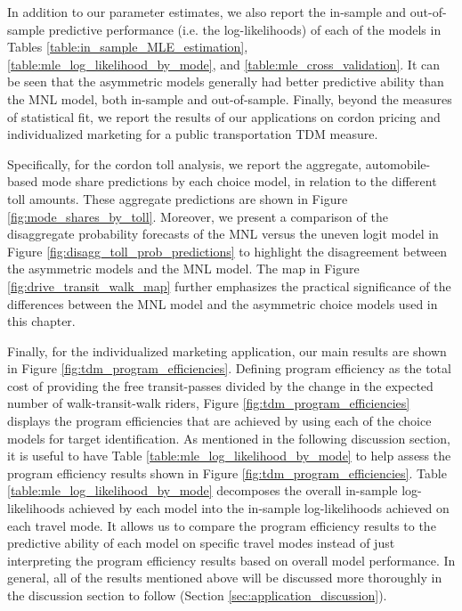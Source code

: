In addition to our parameter estimates, we also report the in-sample and out-of-sample predictive performance (i.e. the log-likelihoods) of each of the models in Tables \ref{table:in_sample_MLE_estimation}, \ref{table:mle_log_likelihood_by_mode}, and \ref{table:mle_cross_validation}. It can be seen that the asymmetric models generally had better predictive ability than the MNL model, both in-sample and out-of-sample. Finally, beyond the measures of statistical fit, we report the results of our applications on cordon pricing and individualized marketing for a public transportation TDM measure.

Specifically, for the cordon toll analysis, we report the aggregate, automobile-based mode share predictions by each choice model, in relation to the different toll amounts. These aggregate predictions are shown in Figure \ref{fig:mode_shares_by_toll}. Moreover, we present a comparison of the disaggregate probability forecasts of the MNL versus the uneven logit model in Figure \ref{fig:disagg_toll_prob_predictions} to highlight the disagreement between the asymmetric models and the MNL model. The map in Figure \ref{fig:drive_transit_walk_map} further emphasizes the practical significance of the differences between the MNL model and the asymmetric choice models used in this chapter. 

Finally, for the individualized marketing application, our main results are shown in Figure \ref{fig:tdm_program_efficiencies}. Defining program efficiency as the total cost of providing the free transit-passes divided by the change in the expected number of walk-transit-walk riders, Figure \ref{fig:tdm_program_efficiencies} displays the program efficiencies that are achieved by using each of the choice models for target identification. As mentioned in the following discussion section, it is useful to have Table \ref{table:mle_log_likelihood_by_mode} to help assess the program efficiency results shown in Figure \ref{fig:tdm_program_efficiencies}. Table \ref{table:mle_log_likelihood_by_mode} decomposes the overall in-sample log-likelihoods achieved by each model into the in-sample log-likelihoods achieved on each travel mode. It allows us to compare the program efficiency results to the predictive ability of each model on specific travel modes instead of just interpreting the program efficiency results based on overall model performance. In general, all of the results mentioned above will be discussed more thoroughly in the discussion section to follow (Section \ref{sec:application_discussion}).

